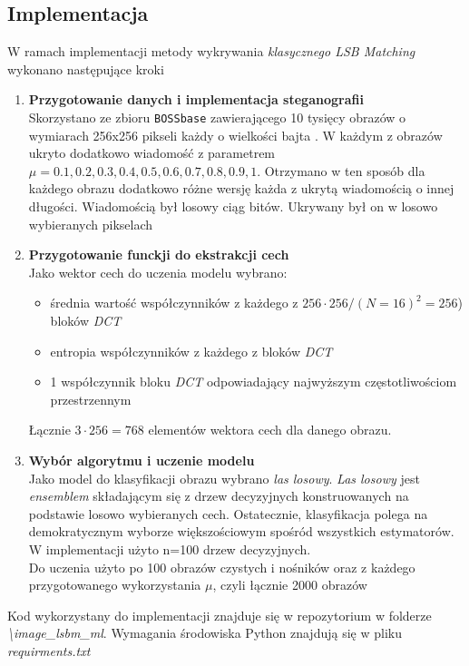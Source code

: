 \documentclass[a4paper,12pt]{article}
\begin{document}
    \subsection{Implementacja}
        W ramach implementacji metody wykrywania \textit{klasycznego LSB Matching} wykonano następujące kroki
        \begin{enumerate}
            \item \textbf{Przygotowanie danych i implementacja steganografii}\\
            Skorzystano ze zbioru \texttt{BOSSbase} zawierającego 10 tysięcy obrazów o wymiarach 256x256 pikseli każdy o wielkości bajta \cite{bossbase}. W każdym z obrazów ukryto dodatkowo wiadomość z parametrem $\mu = 0.1, 0.2, 0.3, 0.4, 0.5, 0.6, 0.7, 0.8, 0.9, 1$. Otrzymano w ten sposób dla każdego obrazu dodatkowo różne wersję każda z ukrytą wiadomością o innej długości. Wiadomością był losowy ciąg bitów. Ukrywany był on w losowo wybieranych pikselach
            \item \textbf{Przygotowanie funckji do ekstrakcji cech}\\
            Jako wektor cech do uczenia modelu wybrano:
            \begin{itemize}
                \item średnia wartość współczynników z każdego z $256\cdot256 / (N=16)^2 = 256$) bloków \textit{DCT}
                \item entropia współczynników z każdego z bloków \textit{DCT}
                \item 1 współczynnik bloku \textit{DCT} odpowiadający najwyższym częstotliwościom przestrzennym
            \end{itemize}
            Łącznie $3\cdot256=768$ elementów wektora cech dla danego obrazu.
            \item \textbf{Wybór algorytmu i uczenie modelu}\\
            Jako model do klasyfikacji obrazu wybrano \textit{las losowy}. \textit{Las losowy} jest \textit{ensemblem} składającym się z drzew decyzyjnych konstruowanych na podstawie losowo wybieranych cech. Ostatecznie, klasyfikacja polega na demokratycznym wyborze większościowym spośród wszystkich estymatorów. W implementacji użyto n=100 drzew decyzyjnych.\cite{random_forest}\\
            Do uczenia użyto po 100 obrazów czystych i nośników oraz z każdego przygotowanego wykorzystania $\mu$, czyli łącznie 2000 obrazów
        \end{enumerate}
        Kod wykorzystany do implementacji znajduje się w repozytorium w folderze \textit{\textbackslash image\_lsbm\_ml}. Wymagania środowiska Python znajdują się w pliku \textit{requirments.txt}
        
\end{document}
